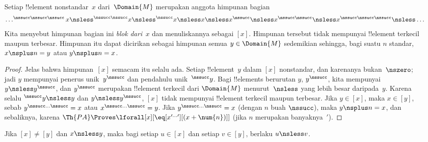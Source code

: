 \documentclass[../../../include/open-logic-section]{subfiles}
\begin{document}
\begin{prop}
Setiap !!{element} nonstandar~$x$ dari~$\Domain{M}$ merupakan anggota
himpunan bagian
\[
\dots ^{\nssucc\nssucc\nssucc}x \nsless ^{\nssucc\nssucc}x \nsless
^{\nssucc}x \nsless x \nsless x^{\nssucc} \nsless x^{\nssucc\nssucc}
\nsless x^{\nssucc\nssucc\nssucc} \nsless \dots
\]
Kita menyebut himpunan bagian ini \emph{blok dari~$x$} dan menuliskannya
sebagai $[x]$. Himpunan tersebut tidak mempunyai !!{element} terkecil maupun
terbesar. Himpunan itu dapat dicirikan sebagai himpunan semua
$y \in \Domain{M}$ sedemikian sehingga, bagi suatu $n$ standar,
$x \nsplus n = y$ atau $y \nsplus n = x$.
\end{prop}

\begin{proof}
Jelas bahwa himpunan~$[x]$ semacam itu selalu ada. Setiap !!{element}~$y$
dalam $[x]$ nonstandar, dan karenanya bukan~$\nszero$; jadi $y$ mempunyai
penerus unik~$y^\nssucc$ dan pendahulu unik~$^\nssucc y$. Bagi
!!{element}s berurutan $y$, $y^\nssucc$, kita mempunyai
$y \nsless y^\nssucc$, dan $y^\nssucc$ merupakan !!{element} terkecil dari
$\Domain{M}$ menurut~$\nsless$ yang lebih besar daripada~$y$. Karena selalu
$^\nssucc y \nsless y$ dan $y \nsless y^\nssucc$, $[x]$ tidak mempunyai
!!{element} terkecil maupun terbesar. Jika $y \in [x]$, maka $x \in [y]$,
sebab $y^{\nssucc\dots\nssucc} = x$ atau
$x^{\nssucc\dots\nssucc} = y$. Jika $y^{\nssucc\dots\nssucc} = x$
(dengan $n$ buah $\nssucc$), maka $y \nsplus n = x$, dan sebaliknya, karena
$\Th{PA} \Proves \lforall[x][\eq[x^{\prime\dots\prime}][(x +
    \num{n})]]$ (jika $n$ merupakan banyaknya~$\prime$).
\end{proof}

\begin{prop}
Jika $[x] \neq [y]$ dan $x \nsless y$, maka bagi setiap $u \in [x]$ dan
setiap $v \in [y]$, berlaku $u \nsless v$.
\end{prop}
\end{document}
